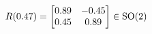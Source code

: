 \documentclass[preview]{standalone}
\begin{document}
\begin{align*}
\special{dvisvgm:raw <g id='unique000'>}R(0.47) = \begin{bmatrix} 0.89 & -0.45 \\ 0.45 & 0.89 \end{bmatrix} \in \text{SO}(2)\special{dvisvgm:raw </g>}
\end{align*}
\end{document}
